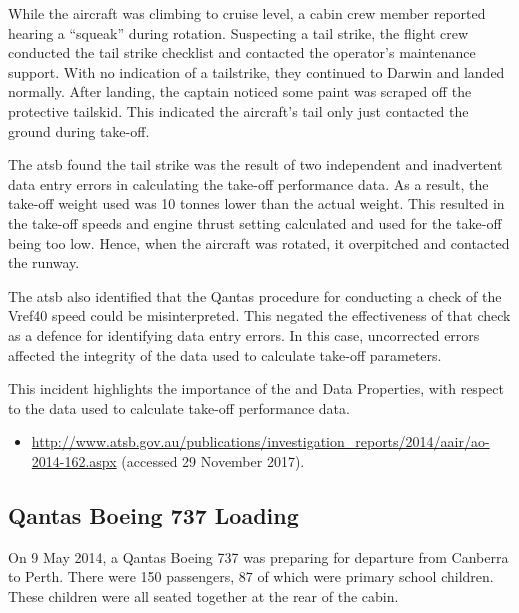 While the aircraft was climbing to cruise level, a cabin crew member reported hearing a ``squeak'' during rotation. Suspecting a tail strike, the flight crew conducted the tail strike checklist and contacted the operator's maintenance support. With no indication of a tailstrike, they continued to Darwin and landed normally. After landing, the captain noticed some paint was scraped off the protective tailskid. This indicated the aircraft's tail only just contacted the ground during take-off.

The \gls{atsb} found the tail strike was the result of two independent and inadvertent data entry errors in calculating the take-off performance data. As a result, the take-off weight used was 10 tonnes lower than the actual weight. This resulted in the take-off speeds and engine thrust setting calculated and used for the take-off being too low. Hence, when the aircraft was rotated, it overpitched and contacted the runway.

The \gls{atsb} also identified that the Qantas procedure for conducting a check of the Vref40 speed could be misinterpreted. This negated the effectiveness of that check as a defence for identifying data entry errors. In this case, uncorrected errors affected the integrity of the data used to calculate take-off parameters.

This incident highlights the importance of the  and  Data Properties, with respect to the data used to calculate take-off performance data.

\begin{samepage}
\begin{itemize}
  \item \raggedright{\href{http://www.atsb.gov.au/publications/investigation_reports/2014/aair/ao-2014-162.aspx}{http://www.atsb.gov.au/publications/investigation\_reports/2014/aair/ao-2014-162.aspx} (accessed 29 November 2017).}
\end{itemize}
\end{samepage}


\subsection{Qantas Boeing 737 Loading} \label{bkm:incacc:qantasloading}
On 9 May 2014, a Qantas Boeing 737 was preparing for departure from Canberra to Perth. There were 150 passengers, 87 of which were primary school children. These children were all seated together at the rear of the cabin. 

